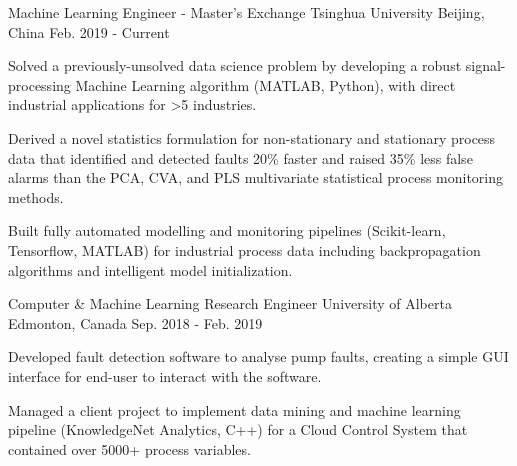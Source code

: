 

\begin{cventries}

  \cventry
    {Machine Learning Engineer - Master's Exchange} %
    {Tsinghua University} %
    {Beijing, China} %
    {Feb. 2019 - Current} %
    {
      \begin{cvitems} %
        \item {Solved a previously-unsolved data science problem by developing a robust signal-processing Machine Learning algorithm (MATLAB, Python), with direct industrial applications for >5 industries.}
        \item {Derived a novel statistics formulation for non-stationary and stationary process data that identified and detected faults 20\% faster and raised 35\% less false alarms than the PCA, CVA, and PLS multivariate statistical process monitoring methods.}
        \item {Built fully automated modelling and monitoring pipelines (Scikit-learn, Tensorflow, MATLAB) for industrial process data including backpropagation algorithms and intelligent model initialization.}
      \end{cvitems}
    }

  \cventry
    {Computer \& Machine Learning Research Engineer} %
    {University of Alberta} %
    {Edmonton, Canada} %
    {Sep. 2018 - Feb. 2019} %
    {
      \begin{cvitems} %
        \item {Developed fault detection software to analyse pump faults, creating a simple GUI interface for end-user to interact with the software.}
        \item {Managed a client project to implement data mining and machine learning pipeline (KnowledgeNet Analytics, C++) for a Cloud Control System that contained over 5000+ process variables.}
      \end{cvitems}
    }


\end{cventries}
